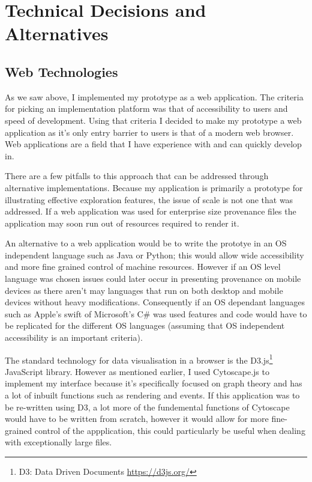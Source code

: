 \chapter{Technical Decisions and Alternatives}

\section{Web Technologies}
\label{sec:web_technologies}

As we saw above, I implemented my prototype as a web application. The criteria for picking an implementation platform was that of accessibility to users and speed of development. Using that criteria I decided to make my prototype a web application as it's only entry barrier to users is that of a modern web browser. Web applications are a field that I have experience with and can quickly develop in. 

There are a few pitfalls to this approach that can be addressed through alternative implementations. Because my application is primarily a prototype for illustrating effective exploration features, the issue of scale is not one that was addressed. If a web application was used for enterprise size provenance files the application may soon run out of resources required to render it.

An alternative to a web application would be to write the prototye in an OS independent language such as Java or Python; this would allow wide accessibility and more fine grained control of machine resources. However if an OS level language was chosen issues could later occur in presenting provenance on mobile devices as there aren't may languages that run on both desktop and mobile devices without heavy modifications. Consequently if an OS dependant languages such as Apple's swift of Microsoft's C\# was used features and code would have to be replicated for the different OS languages (assuming that OS independent accessibility is an important criteria).

The standard technology for data visualisation in a browser is the D3.js\footnote{D3: Data Driven Documents \url{https://d3js.org/}} JavaScript library. However as mentioned earlier, I used Cytoscape.js to implement my interface because it's specifically focused on graph theory and has a lot of inbuilt functions such as rendering and events. If this application was to be re-written using D3, a lot more of the fundemental functions of Cytoscape would have to be written from scratch, however it would allow for more fine-grained control of the appplication, this could particularly be useful when dealing with exceptionally large files.

